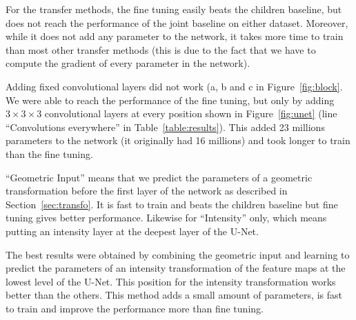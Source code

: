 

For the transfer methods, the fine tuning easily beats the children baseline, but does not reach the performance of the joint baseline on either dataset. Moreover, while it does not add any parameter to the network, it takes more time to train than most other transfer methods (this is due to the fact that we have to compute the gradient of every parameter in the network).

Adding fixed convolutional layers did not work (a, b and c in Figure~\ref{fig:block}. We were able to reach the performance of the fine tuning, but only by adding $3 \times 3 \times 3$ convolutional layers at every position shown in Figure~\ref{fig:unet} (line  ``Convolutions everywhere'' in Table~\ref{table:results}).  This added 23 millions parameters to the network (it originally had 16 millions) and took longer to train than the fine tuning.

``Geometric Input'' means that we predict the parameters of a geometric transformation before the first layer of the network as described in Section~\ref{sec:transfo}. It is fast to train and beats the children baseline but fine tuning gives better performance. Likewise for ``Intensity'' only, which means putting an intensity layer at the deepest layer of the U-Net.

The best results were obtained by combining the geometric input and learning to predict the parameters of an intensity transformation of the feature maps at the lowest level of the U-Net. This position for the intensity transformation works better than the others. This method adds a small amount of parameters, is fast to train and improve the performance more than fine tuning.

